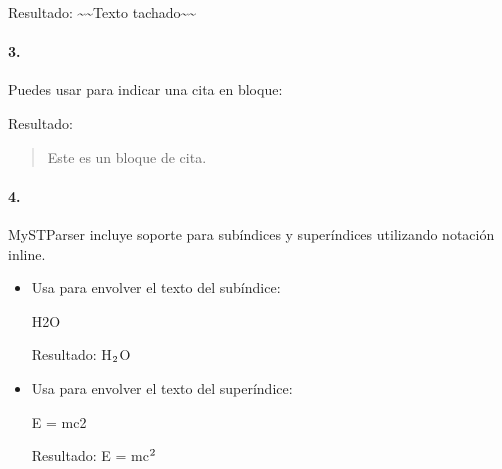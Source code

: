 \documentclass[a4paper,10pt,oneside,spanish,openany]{sphinxmanual}
\begin{document}
\begin{sphinxVerbatim}[commandchars=\\\{\}]
\end{sphinxVerbatim}

\sphinxAtStartPar
Resultado: \textasciitilde{}\textasciitilde{}Texto tachado\textasciitilde{}\textasciitilde{}


\paragraph{3. }
\label{\detokenize{configuracion_inicial/013.guia_de_myst_parser:citas-tipograficas}}
\sphinxAtStartPar
Puedes usar \sphinxcode{\sphinxupquote{\textgreater{}}} para indicar una cita en bloque:

\begin{sphinxVerbatim}[commandchars=\\\{\}]
\end{sphinxVerbatim}

\sphinxAtStartPar
Resultado:
\begin{quote}

\sphinxAtStartPar
Este es un bloque de cita.
\end{quote}


\paragraph{4. }
\label{\detokenize{configuracion_inicial/013.guia_de_myst_parser:subindice-y-superindice}}
\sphinxAtStartPar
MyST\sphinxhyphen{}Parser incluye soporte para subíndices y superíndices utilizando notación inline.
\begin{itemize}
\item {} 
\sphinxAtStartPar
{} Usa \sphinxcode{\sphinxupquote{\textasciitilde{}}} para envolver el texto del subíndice:

\begin{sphinxVerbatim}[commandchars=\\\{\}]
H\PYGZti{}2\PYGZti{}O
\end{sphinxVerbatim}

\sphinxAtStartPar
Resultado: H\(\sb{\text{2}}\)O

\item {} 
\sphinxAtStartPar
{} Usa \sphinxcode{\sphinxupquote{\textasciicircum{}}} para envolver el texto del superíndice:

\begin{sphinxVerbatim}[commandchars=\\\{\}]
E = mc\PYGZca{}2\PYGZca{}
\end{sphinxVerbatim}

\sphinxAtStartPar
Resultado: E = mc\(\sp{\text{2}}\)

\end{itemize}
\end{document}
